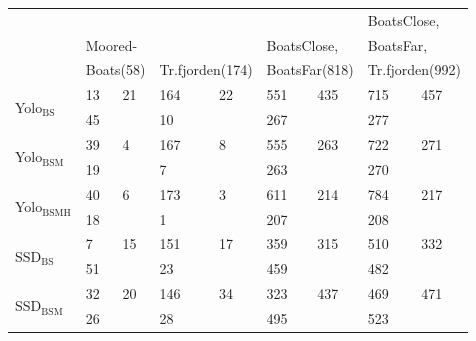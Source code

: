 \begin{table}[h!]
\centering
\begin{tabular}{l|ll|ll|ll|ll}
                       & \multicolumn{2}{l|}{} & \multicolumn{2}{l|}{} & \multicolumn{2}{l|}{} & \multicolumn{2}{l}{BoatsClose,} \\ 
                       
                       & \multicolumn{2}{l|}{Moored-} & \multicolumn{2}{l|}{} & \multicolumn{2}{l|}{BoatsClose,} & \multicolumn{2}{l}{BoatsFar,} \\ 

                       & \multicolumn{2}{l|}{Boats(58)} & \multicolumn{2}{l|}{Tr.fjorden(174)} & \multicolumn{2}{l|}{BoatsFar(818)} & \multicolumn{2}{l}{Tr.fjorden(992)} \\
                       
                        \hline
\multirow{2}{*}{Yolo$_{\text{BS}}$} & 13            & 21           & 164            & 22            & 551            & 435            & 715              & 457             \\
                       & 45            &              & 10             &               & 267            &                & 277              &                 \\ \hline

\multirow{2}{*}{Yolo$_{\text{BSM}}$} & 39            & 4            & 167            & 8             & 555            & 263            & 722              & 271             \\
                       & 19            &              & 7              &               & 263            &                & 270              &                 \\ \hline
\multirow{2}{*}{Yolo$_{\text{BSMH}}$} & 40            & 6            & 173            & 3             & 611            & 214            & 784              & 217             \\
                       & 18            &              & 1              &               & 207            &                & 208              &                 \\ \hline
\multirow{2}{*}{SSD$_{\text{BS}}$}  & 7             & 15           & 151            & 17            & 359            & 315            & 510              & 332             \\
                       & 51            &              & 23             &               & 459            &                & 482              &                 \\ \hline
\multirow{2}{*}{SSD$_{\text{BSM}}$}  & 32            & 20           & 146            & 34            & 323            & 437            & 469              & 471             \\
                       & 26            &              & 28             &               & 495            &                & 523              &                 \\ \hline


\end{tabular}
\end{table}
